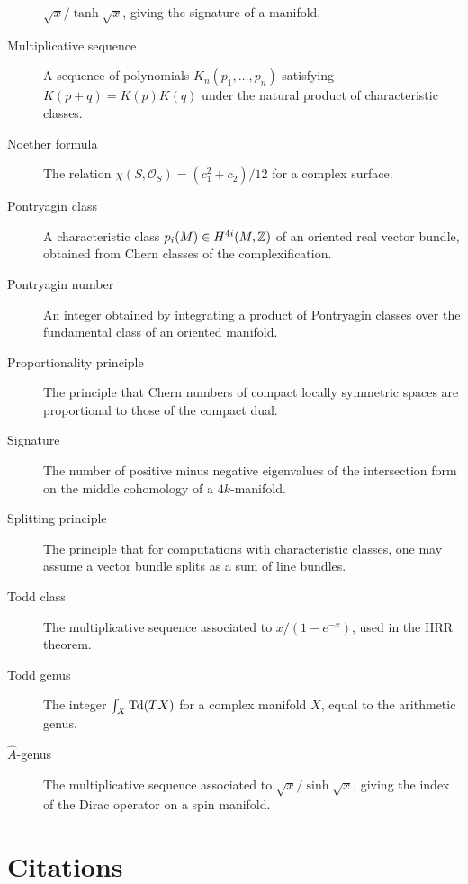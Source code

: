 \begin{description}
    \(\sqrt{x}/\tanh\sqrt{x}\), giving the signature of a manifold.
    \item[Multiplicative sequence] A sequence of polynomials
    \(K_n(p_1, \dots, p_n)\) satisfying \(K(p+q) = K(p) K(q)\) under
    the natural product of characteristic classes.
    \item[Noether formula] The relation
    \(\chi(S, \mathcal{O}_S) = (c_1^2 + c_2)/12\) for a complex
    surface.
    \item[Pontryagin class] A characteristic class
    \(p_i(M) \in H^{4i}(M, \mathbb{Z})\) of an oriented real vector bundle,
    obtained from Chern classes of the complexification.
    \item[Pontryagin number] An integer obtained by integrating a
    product of Pontryagin classes over the fundamental class of an
    oriented manifold.
    \item[Proportionality principle] The principle that Chern numbers
    of compact locally symmetric spaces are proportional to those of
    the compact dual.
    \item[Signature] The number of positive minus negative eigenvalues
    of the intersection form on the middle cohomology of a
    \(4k\)-manifold.
    \item[Splitting principle] The principle that for computations
    with characteristic classes, one may assume a vector bundle
    splits as a sum of line bundles.
    \item[Todd class] The multiplicative sequence associated to
    \(x/(1 - e^{-x})\), used in the HRR theorem.
    \item[Todd genus] The integer \(\int_X \operatorname{Td}(TX)\) for a complex
    manifold \(X\), equal to the arithmetic genus.
    \item[\(\hat{A}\)-genus] The multiplicative sequence associated to
    \(\sqrt{x}/\sinh\sqrt{x}\), giving the index of the Dirac operator
    on a spin manifold.
\end{description}

\section{Citations}

